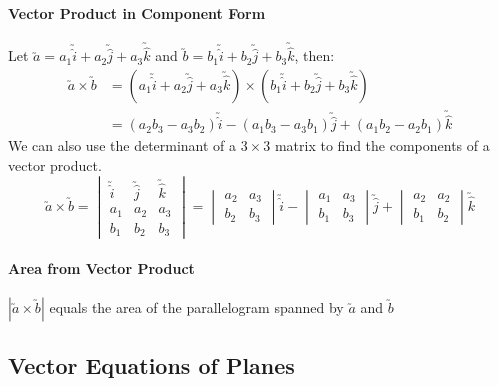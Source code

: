 \documentclass[a4paper,twoside,10pt]{article}
\begin{document}
			\paragraph{Vector Product in Component Form}
				Let $\utilde{a}=a_1\utilde{\hat{i}}+a_2\utilde{\hat{j}}+a_3\utilde{\hat{k}}$ and $\utilde{b}=b_1\utilde{\hat{i}}+b_2\utilde{\hat{j}}+b_3\utilde{\hat{k}}$, then:
				\begin{align*}
					\utilde{a}\times\utilde{b}&=\left(a_1\utilde{\hat{i}}+a_2\utilde{\hat{j}}+a_3\utilde{\hat{k}}\right)\times\left(b_1\utilde{\hat{i}}+b_2\utilde{\hat{j}}+b_3\utilde{\hat{k}}\right)\\
					&=(a_2b_3-a_3b_2)\utilde{\hat{i}}-(a_1b_3-a_3b_1)\utilde{\hat{j}}+(a_1b_2-a_2b_1)\utilde{\hat{k}}
				\end{align*}
				We can also use the determinant of a $3\times3$ matrix to find the components of a vector product.
				\begin{equation*}
					\utilde{a}\times\utilde{b}=\begin{vmatrix}
						\utilde{\hat{i}} & \utilde{\hat{j}} & \utilde{\hat{k}} \\
						a_1 & a_2 & a_3 \\
						b_1 & b_2 & b_3
					\end{vmatrix}=\begin{vmatrix}
						a_2 & a_3 \\
						b_2 & b_3
					\end{vmatrix}\utilde{\hat{i}} - \begin{vmatrix}
						a_1 & a_3 \\
						b_1 & b_3
					\end{vmatrix}\utilde{\hat{j}} + \begin{vmatrix}
						a_2 & a_2 \\
						b_1 & b_2
					\end{vmatrix}\utilde{\hat{k}}
				\end{equation*}
			
			\paragraph{Area from Vector Product} $|\utilde{a}\times\utilde{b}|$ equals the area of the parallelogram spanned by $\utilde{a}$ and $\utilde{b}$
		\subsection{Vector Equations of Planes}
\end{document}
